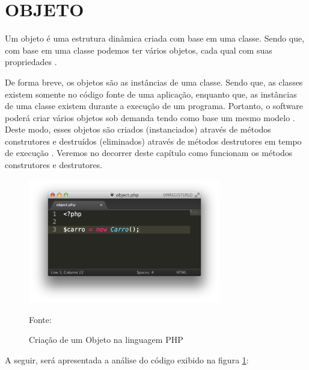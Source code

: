 \section{OBJETO}

Um objeto é uma estrutura dinâmica criada com base em uma classe. Sendo que, 
com base em uma classe podemos ter vários objetos, cada qual com suas 
propriedades \cite{phpProgramandoComOrientacaoAObjetos}. 

De forma breve, os objetos são as instâncias de uma classe. Sendo que, as
classes existem somente no código fonte de uma aplicação, enquanto que, as 
instâncias de uma classe existem durante a execução de um programa. Portanto, 
o software poderá criar vários objetos sob demanda tendo como base um mesmo 
modelo \cite{ios7ProgrammingFundamentalsObjectiveCXcodeAndCocoaBasics}. Deste
modo, esses objetos são criados (instanciados) através de métodos construtores 
e destruídos (eliminados) através de métodos destrutores em tempo de execução
\cite{umlEC++GuiaPraticoDeDesenvolvimentoOrientadoAObjeto}. Veremos no decorrer
deste capítulo como funcionam os métodos construtores e destrutores.

\begin{figure}[h!tb]
	\caption{Criação de um Objeto na linguagem PHP}
	\label{fig:objeto}
	
	\centering
	\includegraphics[width=0.75\textwidth]{images/object.png}
	
	\centering
	\footnotesize Fonte: \fonteOAutor
\end{figure}

\FloatBarrier 	%

A seguir, será apresentada a análise do código exibido na
figura \ref{fig:objeto}: 

